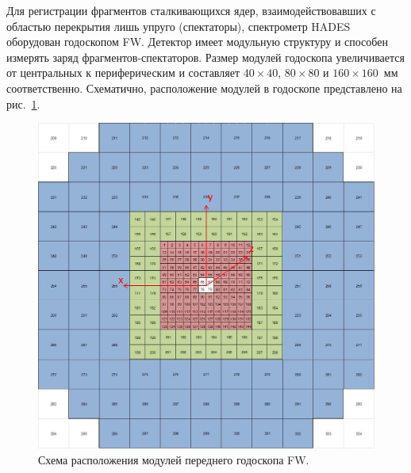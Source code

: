 Для регистрации фрагментов сталкивающихся ядер, взаимодействовавших с областью перекрытия лишь упруго (спектаторы), спектрометр HADES оборудован годоскопом FW.
Детектор имеет модульную структуру и способен измерять заряд фрагментов-спектаторов.
Размер модулей годоскопа увеличивается от центральных к периферическим и составляет $40\times40$, $80\times80$ и $160\times160$~мм соответственно.
Схематично, расположение модулей в годоскопе представлено на рис.~\ref{fig:hodo_layout}.
%
\begin{figure}[ht]
\begin{center}
\includegraphics[width=0.75\linewidth]{images/FW_layout.jpg}
\caption{Схема расположения модулей переднего годоскопа FW.}
\label{fig:hodo_layout}
\end{center}
\end{figure}


